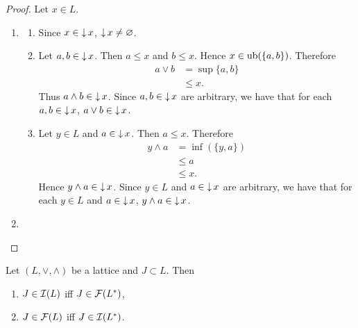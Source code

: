 \documentclass{book}
\begin{document}
	\begin{proof}
		Let $x \in L$.
		\begin{enumerate}
			\item 
			\begin{enumerate}
				\item Since $x \in \operatorname{\downarrow} x$, $\operatorname{\downarrow} x \neq \varnothing$.
				\item Let $a,b \in \operatorname{\downarrow} x$. Then $a \leq x$ and $b \leq x$. Hence $x \in \operatorname{ub}(\{a,b\})$. Therefore 
				\begin{align*}
					a \vee b
					& = \sup \{a,b\} \\
					& \leq x.
				\end{align*}
				Thus $a \wedge b \in \operatorname{\downarrow} x$. Since $a,b \in \operatorname{\downarrow} x$ are arbitrary, we have that for each $a,b \in \operatorname{\downarrow} x$, $a \vee b \in \operatorname{\downarrow} x$.
				\item Let $y \in L$ and $a \in \operatorname{\downarrow} x$. Then $a \leq x$. Therefore 
				\begin{align*}
					y \wedge a
					& = \inf( \{y, a\}) \\
					& \leq a \\
					& \leq x.
				\end{align*}
				Hence $y \wedge a \in \operatorname{\downarrow} x$. Since $y \in L$ and $a \in \operatorname{\downarrow} x$ are arbitrary, we have that for each $y \in L$ and $a \in \operatorname{\downarrow} x$, $y \wedge a \in \operatorname{\downarrow} x$.
			\end{enumerate}
			\item {}
		\end{enumerate}
	\end{proof}
	
	\begin{ex}
		Let $(L, \vee, \wedge)$ be a lattice and $J \subset L$. Then
		\begin{enumerate}
			\item $J \in \mathcal{I}(L)$ iff $J \in \mathcal{F}(L^*)$,
			\item $J \in \mathcal{F}(L)$ iff $J \in \mathcal{I}(L^*)$.
		\end{enumerate}
	\end{ex}
	
\end{document}
